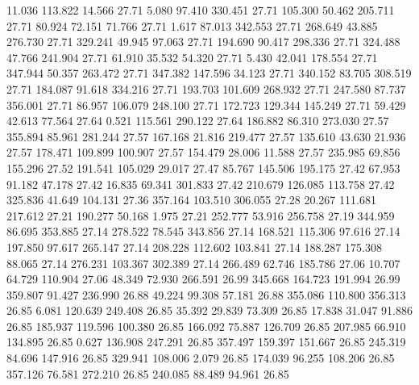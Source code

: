   11.036  113.822   14.566        27.71
   5.080   97.410  330.451        27.71
 105.300   50.462  205.711        27.71
  80.924   72.151   71.766        27.71
   1.617   87.013  342.553        27.71
 268.649   43.885  276.730        27.71
 329.241   49.945   97.063        27.71
 194.690   90.417  298.336        27.71
 324.488   47.766  241.904        27.71
  61.910   35.532   54.320        27.71
   5.430   42.041  178.554        27.71
 347.944   50.357  263.472        27.71
 347.382  147.596   34.123        27.71
 340.152   83.705  308.519        27.71
 184.087   91.618  334.216        27.71
 193.703  101.609  268.932        27.71
 247.580   87.737  356.001        27.71
  86.957  106.079  248.100        27.71
 172.723  129.344  145.249        27.71
  59.429   42.613   77.564        27.64
   0.521  115.561  290.122        27.64
 186.882   86.310  273.030        27.57
 355.894   85.961  281.244        27.57
 167.168   21.816  219.477        27.57
 135.610   43.630   21.936        27.57
 178.471  109.899  100.907        27.57
 154.479   28.006   11.588        27.57
 235.985   69.856  155.296        27.52
 191.541  105.029   29.017        27.47
  85.767  145.506  195.175        27.42
  67.953   91.182   47.178        27.42
  16.835   69.341  301.833        27.42
 210.679  126.085  113.758        27.42
 325.836   41.649  104.131        27.36
 357.164  103.510  306.055        27.28
  20.267  111.681  217.612        27.21
 190.277   50.168    1.975        27.21
 252.777   53.916  256.758        27.19
 344.959   86.695  353.885        27.14
 278.522   78.545  343.856        27.14
 168.521  115.306   97.616        27.14
 197.850   97.617  265.147        27.14
 208.228  112.602  103.841        27.14
 188.287  175.308   88.065        27.14
 276.231  103.367  302.389        27.14
 266.489   62.746  185.786        27.06
  10.707   64.729  110.904        27.06
  48.349   72.930  266.591        26.99
 345.668  164.723  191.994        26.99
 359.807   91.427  236.990        26.88
  49.224   99.308   57.181        26.88
 355.086  110.800  356.313        26.85
   6.081  120.639  249.408        26.85
  35.392   29.839   73.309        26.85
  17.838   31.047   91.886        26.85
 185.937  119.596  100.380        26.85
 166.092   75.887  126.709        26.85
 207.985   66.910  134.895        26.85
   0.627  136.908  247.291        26.85
 357.497  159.397  151.667        26.85
 245.319   84.696  147.916        26.85
 329.941  108.006    2.079        26.85
 174.039   96.255  108.206        26.85
 357.126   76.581  272.210        26.85
 240.085   88.489   94.961        26.85
